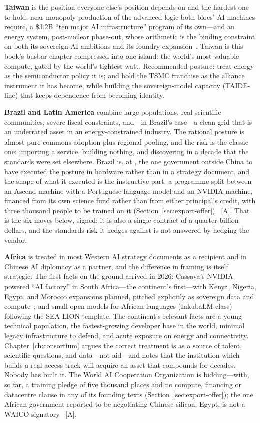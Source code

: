 \textbf{Taiwan} is the position everyone else's position depends on and the hardest one to hold: near-monopoly production of the advanced logic both blocs' AI machines require, a \$3.2B ``ten major AI infrastructure'' program of its own---and an energy system, post-nuclear phase-out, whose arithmetic is the binding constraint on both its sovereign-AI ambitions and its foundry expansion~\cite{taiwan-energy}. Taiwan is this book's busbar chapter compressed into one island: the world's most valuable compute, gated by the world's tightest watt. Recommended posture: treat energy as the semiconductor policy it is; and hold the TSMC franchise as the alliance instrument it has become, while building the sovereign-model capacity (TAIDE-line) that keeps dependence from becoming identity.

\textbf{Brazil and Latin America} combine large populations, real scientific communities, severe fiscal constraints, and---in Brazil's case---a clean grid that is an underrated asset in an energy-constrained industry. The rational posture is almost pure commons adoption plus regional pooling, and the risk is the classic one: importing a service, building nothing, and discovering in a decade that the standards were set elsewhere. Brazil is, at \datafreeze, the one government outside China to have executed the posture in hardware rather than in a strategy document, and the shape of what it executed is the instructive part: a programme split between an Ascend machine with a Portuguese-language model and an NVIDIA machine, financed from its own science fund rather than from either principal's credit, with three thousand people to be trained on it (Section~\ref{sec:export-offer})~\cite{brazil-ai-supercomputer} [A]. That is the six moves below, signed; it is also a single contract of a quarter-billion dollars, and the standards risk it hedges against is not answered by hedging the vendor.

\textbf{Africa} is treated in most Western AI strategy documents as a recipient and in Chinese AI diplomacy as a partner, and the difference in framing is itself strategic. The first facts on the ground arrived in 2026: Cassava's NVIDIA-powered ``AI factory'' in South Africa---the continent's first---with Kenya, Nigeria, Egypt, and Morocco expansions planned, pitched explicitly as sovereign data and compute~\cite{cassava}; and small open models for African languages (InkubaLM-class) following the SEA-LION template. The continent's relevant facts are a young technical population, the fastest-growing developer base in the world, minimal legacy infrastructure to defend, and acute exposure on energy and connectivity. Chapter~\ref{ch:consortium} argues the correct treatment is as a source of talent, scientific questions, and data---not aid---and notes that the institution which builds a real access track will acquire an asset that compounds for decades. Nobody has built it. The World AI Cooperation Organization is bidding---with, so far, a training pledge of five thousand places and no compute, financing or datacentre clause in any of its founding texts (Section~\ref{sec:export-offer}); the one African government reported to be negotiating Chinese silicon, Egypt, is not a WAICO signatory~\cite{waico,huawei-egypt} [A].

